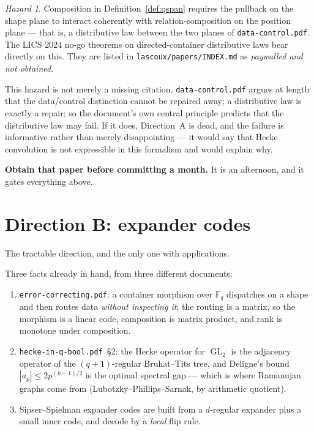 \documentclass[11pt,a4paper]{article}
\theoremstyle{definition}
\theoremstyle{remark}
\newcommand{\HQB}{\texttt{hecke-\allowbreak{}in-\allowbreak{}q-\allowbreak{}bool.pdf}}
\newtheorem{hazard}[theorem]{Hazard}
\newcommand{\FF}{\mathbb{F}}
\DeclareMathOperator{\GL}{GL}
\begin{document}
\begin{hazard}\label{haz:licsno}
Composition in Definition~\ref{def:qspan} requires the pullback on the shape
plane to interact coherently with relation-composition on the position plane ---
that is, a distributive law between the two planes of
\texttt{data-control.pdf}. The LICS 2024 no-go theorems on directed-container
distributive laws bear directly on this. They are listed in
\texttt{lascoux/papers/INDEX.md} as \emph{paywalled and not obtained}.
\end{hazard}

This hazard is not merely a missing citation. \texttt{data-control.pdf} argues at
length that the data/control distinction cannot be repaired away; a distributive
law is exactly a repair; so the document's own central principle predicts that
the distributive law may fail. If it does, Direction~A is dead, and the failure
is informative rather than merely disappointing --- it would say that Hecke
convolution is not expressible in this formalism and would explain why.

\textbf{Obtain that paper before committing a month.} It is an afternoon, and it
gates everything above.

\section{Direction B: expander codes}\label{sec:B}

The tractable direction, and the only one with applications.

Three facts already in hand, from three different documents:

\begin{enumerate}[nosep,label=(\roman*)]
\item \texttt{error-correcting.pdf}: a container morphism over $\FF_q$
dispatches on a shape and then routes data \emph{without inspecting it}; the
routing is a matrix, so the morphism is a linear code, composition is matrix
product, and rank is monotone under composition.
\item \HQB{}~\S2: the Hecke operator for $\GL_2$ is the
adjacency operator of the $(q+1)$-regular Bruhat--Tits tree, and Deligne's
bound $|a_p| \le 2p^{(k-1)/2}$ is the optimal spectral gap --- which is where
Ramanujan graphs come from (Lubotzky--Phillips--Sarnak, by arithmetic quotient).
\item Sipser--Spielman expander codes are built from a $d$-regular expander plus
a small inner code, and decode by a \emph{local} flip rule.
\end{enumerate}
\end{document}
